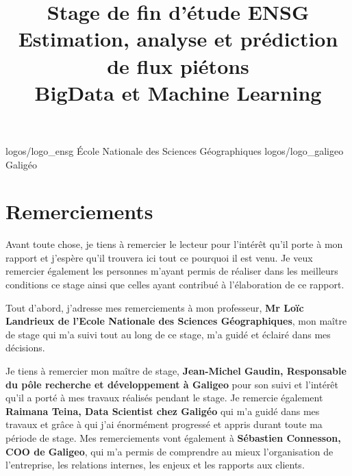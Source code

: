 \documentclass{themeensg}
\title{Stage de fin d'étude ENSG \\ Estimation, analyse et prédiction de flux piétons \\ BigData et Machine Learning}
\renewcommand{\author}{Jules Pierrat}
\begin{document}
\begin{titlepage}
\enterprise 
{logos/logo_ensg}
{\'Ecole Nationale des Sciences Géographiques}
{logos/logo_galigeo}
{Galigéo}





\infos{\author}{Septembre 2022}
\end{titlepage}



\newevenpage
\chapter*{Remerciements}

Avant toute chose, je tiens à remercier le lecteur pour l’intérêt qu’il porte à mon rapport et j’espère qu’il trouvera ici tout ce pourquoi il est venu. Je veux remercier également les personnes m’ayant permis de réaliser dans les meilleurs conditions ce stage ainsi que celles ayant contribué à l’élaboration de ce rapport.

Tout d'abord, j'adresse mes remerciements à mon professeur, \textbf{Mr Loïc Landrieux de l’Ecole Nationale des Sciences Géographiques}, mon maître de stage qui m’a suivi tout au long de ce stage, m’a guidé et éclairé dans mes décisions.

Je tiens à remercier mon maître de stage, \textbf{Jean-Michel Gaudin, Responsable du pôle recherche et développement à Galigeo} pour son suivi et l’intérêt qu’il a porté à mes travaux réalisés pendant le stage. Je remercie également \textbf{Raimana Teina, Data Scientist chez Galigéo} qui m’a guidé dans mes travaux et grâce à qui j’ai énormément progressé et appris durant toute ma période de stage. Mes remerciements vont également à \textbf{Sébastien Connesson, COO de Galigeo}, qui m’a permis de comprendre au mieux l’organisation de l’entreprise, les relations internes, les enjeux et les rapports aux clients.
\end{document}
